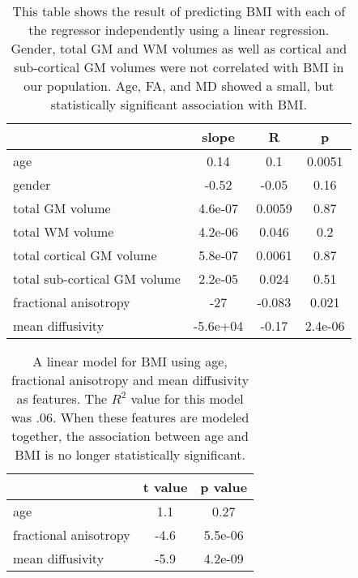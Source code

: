 \begin{table} 
    \begin{tabular}{l | c c c }
        & slope & R & p \\
        \toprule
        age & 0.14 & 0.1 & 0.0051 \\
        gender & -0.52 & -0.05 & 0.16 \\
        total GM volume & 4.6e-07 & 0.0059 & 0.87 \\
        total WM volume & 4.2e-06 & 0.046 & 0.2 \\
        total cortical GM volume & 5.8e-07 & 0.0061 & 0.87 \\
        total sub-cortical GM volume & 2.2e-05 & 0.024 & 0.51 \\
        fractional anisotropy & -27 & -0.083 & 0.021 \\
        mean diffusivity & -5.6e+04 & -0.17 & 2.4e-06 \\
        \bottomrule
        \end{tabular} 
    \caption{\label{tab:basic} This table shows the result of predicting BMI with each of the regressor independently using a linear regression. Gender, total GM and WM volumes as well as cortical and sub-cortical GM volumes were not correlated with BMI in our population. Age, FA, and MD showed a small, but statistically significant association with BMI.} 
\end{table}

\begin{table} 
    \begin{tabular}{ l | c c }
        &t value & p value \\
        \toprule
        age & 1.1 & 0.27 \\
        fractional anisotropy & -4.6 & 5.5e-06 \\
        mean diffusivity & -5.9 & 4.2e-09 \\ 
        \bottomrule
    \end{tabular} 
    \caption{\label{tab:linearmodel} A linear model for BMI using age, fractional anisotropy and mean diffusivity as features. The $R^2$ value for this model was .06. When these features are modeled together, the association between age and BMI is no longer statistically significant.} 
\end{table}